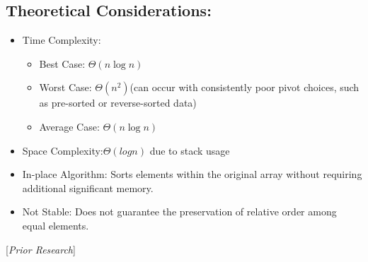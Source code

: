 \documentclass[a4paper, 9pt, twocolumn]{article}
\begin{document}
\subsection*{Theoretical Considerations:}
\begin{itemize}
	\item Time Complexity:
	      \begin{itemize}[label={$\circ$}]
		      \item Best Case: $\Theta(n\log n)$
		      \item Worst Case: $\Theta(n^2)$(can occur with consistently poor pivot choices, such as pre-sorted or reverse-sorted data)
		      \item Average Case: $\Theta(n\log n)$
	      \end{itemize}
	\item Space Complexity:$\Theta(log n)$ due to stack usage
	\item In-place Algorithm: Sorts elements within the original array without requiring additional significant memory.
	\item Not Stable: Does not guarantee the preservation of relative order among equal elements.
\end{itemize}
[\textit{Prior Research}]\cite{hoare1961}\cite{sedgewick1978}
\end{document}
